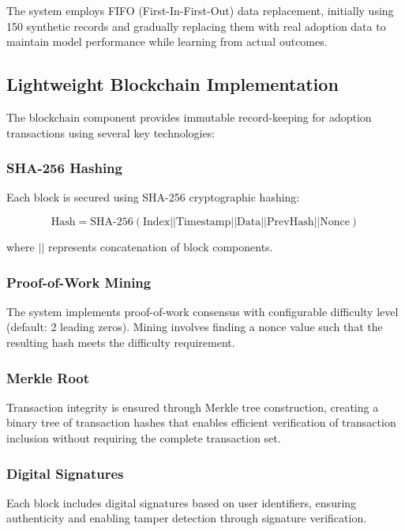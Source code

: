 \documentclass[conference]{IEEEtran}
\begin{document}
The system employs FIFO (First-In-First-Out) data replacement, initially using 150 synthetic records and gradually replacing them with real adoption data to maintain model performance while learning from actual outcomes.

\subsection{Lightweight Blockchain Implementation}

The blockchain component provides immutable record-keeping for adoption transactions using several key technologies:

\subsubsection{SHA-256 Hashing}
Each block is secured using SHA-256 cryptographic hashing:

\begin{equation}
\text{Hash} = \text{SHA-256}(\text{Index}||\text{Timestamp}||\text{Data}||\text{PrevHash}||\text{Nonce})
\end{equation}

where $||$ represents concatenation of block components.

\subsubsection{Proof-of-Work Mining}
The system implements proof-of-work consensus with configurable difficulty level (default: 2 leading zeros). Mining involves finding a nonce value such that the resulting hash meets the difficulty requirement.

\subsubsection{Merkle Root}
Transaction integrity is ensured through Merkle tree construction, creating a binary tree of transaction hashes that enables efficient verification of transaction inclusion without requiring the complete transaction set.

\subsubsection{Digital Signatures}
Each block includes digital signatures based on user identifiers, ensuring authenticity and enabling tamper detection through signature verification.
\end{document}
